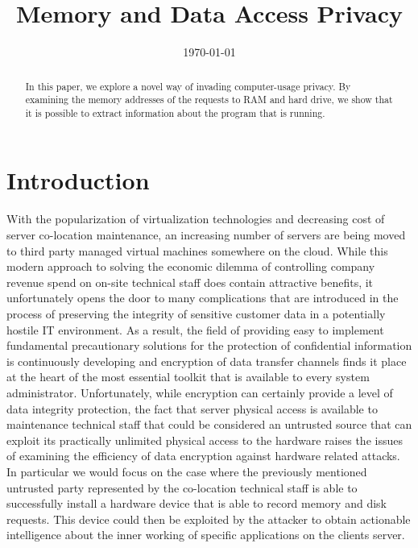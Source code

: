 \documentclass[11pt, oneside]{article}
\begin{document}
\title{Memory and Data Access Privacy}
\author{
     \and
     \and
     \and
     \and
     \and
     \and
     \and
     \and
}
\date{\today}
\maketitle

\begin{abstract}
In this paper, we explore a novel way of invading computer-usage privacy. By
examining the memory addresses of the requests to RAM and hard drive, we show
that it is possible to extract information about the program that is running.
\end{abstract}

\section{Introduction}
With the popularization of virtualization technologies and decreasing cost of 
server co-location maintenance, an increasing number of servers are being 
moved to third party managed virtual machines somewhere on the cloud. While 
this modern approach to solving the economic dilemma of controlling company 
revenue spend    on on-site technical staff does contain attractive benefits, 
it unfortunately opens the door to many complications that are introduced in 
the process of preserving the integrity of sensitive customer data in a 
potentially hostile IT environment. As a result, the field of providing easy 
to implement fundamental precautionary solutions for the protection of 
confidential information is continuously developing and encryption of data 
transfer channels finds it place at the heart of the most essential toolkit 
that is available to every system administrator. Unfortunately, while 
encryption can certainly provide a level of data integrity protection, the 
fact that server physical access is available to maintenance technical staff 
that could be considered an untrusted source that can exploit its practically 
unlimited physical access to the hardware raises the issues of examining the 
efficiency of data encryption against hardware related attacks. In particular 
we would focus on the case where the previously mentioned untrusted party 
represented by the co-location technical staff is able to successfully install 
a hardware device that is able to record memory and disk requests. This device 
could then be exploited by the attacker to obtain actionable intelligence 
about the inner working of specific applications on the clients server.
\end{document}
